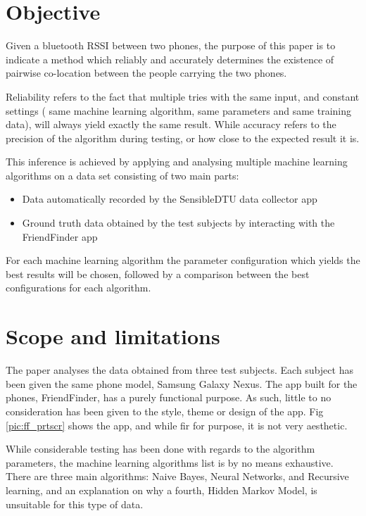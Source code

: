  
\section{Objective}

Given a bluetooth RSSI between two phones, the purpose of this paper is to indicate a method which reliably and accurately determines the existence of pairwise co-location between the people carrying the two phones.

Reliability refers to the fact that multiple tries with the same input, and constant settings ( same machine learning algorithm, same parameters and same training data), will always yield exactly the same result. While accuracy refers to the precision of the algorithm during testing, or how close to the expected result it is. 
 
This inference is achieved by applying and analysing multiple machine learning algorithms on a data set consisting of two main parts:
\begin{itemize}
  \item Data automatically recorded by the SensibleDTU data collector app \cite{Stopczynski}
  \item Ground truth data obtained by the test subjects by interacting with the FriendFinder app
\end{itemize}

For each machine learning algorithm the parameter configuration which yields the best results will be chosen, followed by a comparison between the best configurations for each algorithm.      

\section{Scope and limitations}

The paper analyses the data obtained from three test subjects. Each subject has been given the same phone model, Samsung Galaxy Nexus. The app built for the phones, FriendFinder, has a purely functional purpose. As such, little to no consideration has been given to the style, theme or design of the app. Fig \ref{pic:ff_prtscr} shows the app, and while fir for purpose, it is not very aesthetic.

While considerable testing has been done with regards to the algorithm parameters, the machine learning algorithms list is by no means exhaustive. There are three main algorithms: Naive Bayes, Neural Networks, and Recursive learning, and an explanation on why a fourth, Hidden Markov Model, is unsuitable for this type of data. 

